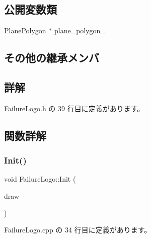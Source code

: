 \subsection*{公開変数類}
\begin{DoxyCompactItemize}
\item 
\mbox{\hyperlink{class_plane_polygon}{Plane\+Polygon}} $\ast$ \mbox{\hyperlink{class_failure_logo_ab41feac9836e9687c75546098ff8f53c}{plane\+\_\+polygon\+\_\+}}
\end{DoxyCompactItemize}
\subsection*{その他の継承メンバ}


\subsection{詳解}


 Failure\+Logo.\+h の 39 行目に定義があります。



\subsection{関数詳解}
\mbox{\label{class_failure_logo_a22da89def55023f43860cf646da7a74c}} 
\subsubsection{\texorpdfstring{Init()}{Init()}}
{\footnotesize\ttfamily void Failure\+Logo\+::\+Init (\begin{DoxyParamCaption}\item[{\mbox{\hyperlink{class_draw_base}{Draw\+Base}} $\ast$}]{draw }\end{DoxyParamCaption})}



 Failure\+Logo.\+cpp の 34 行目に定義があります。

